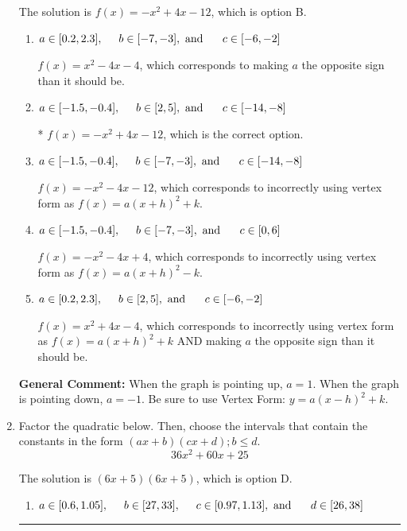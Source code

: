 \documentclass{extbook}[14pt]
\newcommand{\litem}[1]{\item #1

\rule{\textwidth}{0.4pt}}
\begin{document}
\begin{enumerate}
{The solution is \( f(x) = -x^{2} +4 x -12 \), which is option B.\begin{enumerate}[label=\Alph*.]
\item \( a \in [0.2, 2.3], \hspace*{5mm} b \in [-7, -3], \text{ and } \hspace*{5mm} c \in [-6, -2] \)

$f(x)=x^{2} -4 x -4$, which corresponds to making $a$ the opposite sign than it should be.
\item \( a \in [-1.5, -0.4], \hspace*{5mm} b \in [2, 5], \text{ and } \hspace*{5mm} c \in [-14, -8] \)

* $f(x)=-x^{2} +4 x -12$, which is the correct option.
\item \( a \in [-1.5, -0.4], \hspace*{5mm} b \in [-7, -3], \text{ and } \hspace*{5mm} c \in [-14, -8] \)

$f(x)=-x^{2} -4 x -12$, which corresponds to incorrectly using vertex form as $f(x) = a(x+h)^2+k$.
\item \( a \in [-1.5, -0.4], \hspace*{5mm} b \in [-7, -3], \text{ and } \hspace*{5mm} c \in [0, 6] \)

$f(x)=-x^{2} -4 x + 4$, which corresponds to incorrectly using vertex form as $f(x) = a(x+h)^2 - k$.
\item \( a \in [0.2, 2.3], \hspace*{5mm} b \in [2, 5], \text{ and } \hspace*{5mm} c \in [-6, -2] \)

$f(x)=x^{2} +4 x -4$, which corresponds to incorrectly using vertex form as $f(x) = a(x+h)^2+k$ AND making $a$ the opposite sign than it should be.
\end{enumerate}

\textbf{General Comment:} When the graph is pointing up, $a=1$. When the graph is pointing down, $a=-1$. Be sure to use Vertex Form: $y = a(x-h)^2+k$.
}
\litem{
Factor the quadratic below. Then, choose the intervals that contain the constants in the form $(ax+b)(cx+d); b \leq d.$
\[ 36x^{2} +60 x + 25 \]

The solution is \( (6x + 5)(6x + 5) \), which is option D.\begin{enumerate}[label=\Alph*.]
\item \( a \in [0.6, 1.05], \hspace*{5mm} b \in [27, 33], \hspace*{5mm} c \in [0.97, 1.13], \text{ and } \hspace*{5mm} d \in [26, 38] \)


\end{enumerate}}
\end{enumerate}
\end{document}
